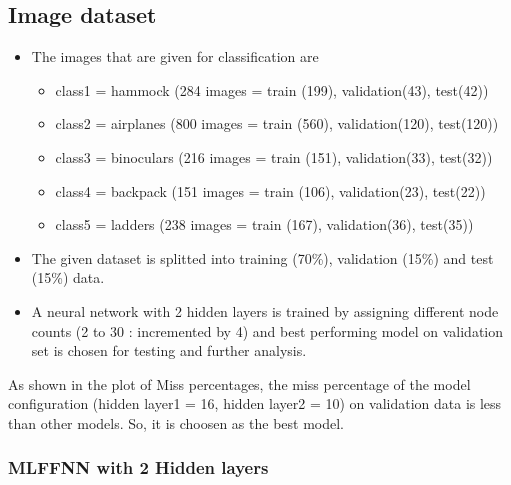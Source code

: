 \documentclass[fleqn]{article}
\begin{document}
\subsection{Image dataset}

\begin{itemize}
\item The images that are given for classification are
\begin{itemize}
  \item class1 = hammock  (284 images = train (199), validation(43), test(42))
  \item class2 = airplanes (800 images = train (560), validation(120), test(120))
  \item class3 = binoculars (216 images = train (151), validation(33), test(32))
  \item class4 = backpack (151 images = train (106), validation(23), test(22))
  \item class5 = ladders (238 images = train (167), validation(36), test(35))
\end{itemize}
\item The given dataset is splitted into training (70\%), validation (15\%) and test (15\%) data.
\item A neural network with 2 hidden layers is trained by assigning different node counts (2 to 30 : incremented by 4) and best performing model on validation set is chosen for testing and further analysis.

\end{itemize}

As shown in the plot of Miss percentages, the miss percentage of the model configuration (hidden layer1 = 16, hidden layer2 = 10) on validation data is less than other models. So, it is choosen as the best model. 

\subsubsection{MLFFNN with 2 Hidden layers}
\end{document}
